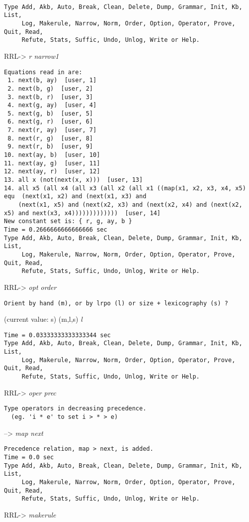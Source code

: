 \scriptsize
\tt
\begin{verbatim}
Type Add, Akb, Auto, Break, Clean, Delete, Dump, Grammar, Init, Kb, List,
     Log, Makerule, Narrow, Norm, Order, Option, Operator, Prove, Quit, Read,
     Refute, Stats, Suffic, Undo, Unlog, Write or Help.
\end{verbatim}
RRL-> {\em r narrow1}
\begin{verbatim}
Equations read in are:
 1. next(b, ay)  [user, 1]
 2. next(b, g)  [user, 2]
 3. next(b, r)  [user, 3]
 4. next(g, ay)  [user, 4]
 5. next(g, b)  [user, 5]
 6. next(g, r)  [user, 6]
 7. next(r, ay)  [user, 7]
 8. next(r, g)  [user, 8]
 9. next(r, b)  [user, 9]
10. next(ay, b)  [user, 10]
11. next(ay, g)  [user, 11]
12. next(ay, r)  [user, 12]
13. all x (not(next(x, x)))  [user, 13]
14. all x5 (all x4 (all x3 (all x2 (all x1 ((map(x1, x2, x3, x4, x5) equ  (next(x1, x2) and (next(x1, x3) and 
    (next(x1, x5) and (next(x2, x3) and (next(x2, x4) and (next(x2, x5) and next(x3, x4)))))))))))))  [user, 14]
New constant set is: { r, g, ay, b }
Time = 0.2666666666666666 sec
Type Add, Akb, Auto, Break, Clean, Delete, Dump, Grammar, Init, Kb, List,
     Log, Makerule, Narrow, Norm, Order, Option, Operator, Prove, Quit, Read,
     Refute, Stats, Suffic, Undo, Unlog, Write or Help.
\end{verbatim}
RRL-> {\em opt order}
\begin{verbatim}
Orient by hand (m), or by lrpo (l) or size + lexicography (s) ?
\end{verbatim}
(current value: s) (m,l,s) {\em l}
\begin{verbatim}
Time = 0.03333333333333344 sec
Type Add, Akb, Auto, Break, Clean, Delete, Dump, Grammar, Init, Kb, List,
     Log, Makerule, Narrow, Norm, Order, Option, Operator, Prove, Quit, Read,
     Refute, Stats, Suffic, Undo, Unlog, Write or Help.
\end{verbatim}
RRL-> {\em oper prec}
\begin{verbatim}
Type operators in decreasing precedence.
  (eg. 'i * e' to set i > * > e) 
\end{verbatim}
--> {\em map next}
\begin{verbatim}
Precedence relation, map > next, is added.
Time = 0.0 sec
Type Add, Akb, Auto, Break, Clean, Delete, Dump, Grammar, Init, Kb, List,
     Log, Makerule, Narrow, Norm, Order, Option, Operator, Prove, Quit, Read,
     Refute, Stats, Suffic, Undo, Unlog, Write or Help.
\end{verbatim}
RRL-> {\em makerule}
